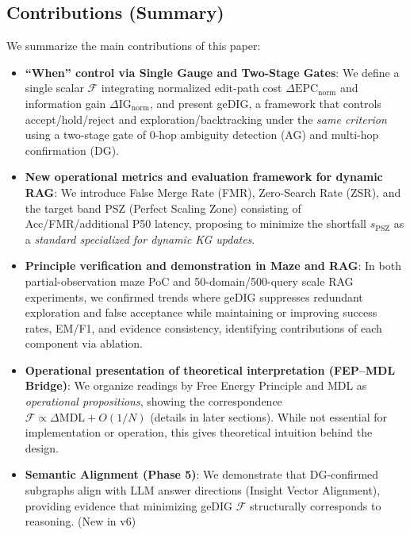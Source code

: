 \documentclass[12pt]{article}
\newcommand{\F}{\mathcal{F}}
\newcommand{\gednorm}{\Delta\mathrm{EPC}_{\mathrm{norm}}}
\newcommand{\ignorm}{\Delta\mathrm{IG}_{\mathrm{norm}}}
\begin{document}
\subsection*{Contributions (Summary)}
We summarize the main contributions of this paper:
\begin{itemize}[leftmargin=1.6em]
  \item \textbf{``When'' control via Single Gauge and Two-Stage Gates}: We define a single scalar $\F$ integrating normalized edit-path cost $\gednorm$ and information gain $\ignorm$, and present geDIG, a framework that controls accept/hold/reject and exploration/backtracking under the \emph{same criterion} using a two-stage gate of 0-hop ambiguity detection (AG) and multi-hop confirmation (DG).
  \item \textbf{New operational metrics and evaluation framework for dynamic RAG}: We introduce False Merge Rate (FMR), Zero-Search Rate (ZSR), and the target band PSZ (Perfect Scaling Zone) consisting of Acc/FMR/additional P50 latency, proposing to minimize the shortfall $s_{\mathrm{PSZ}}$ as a \emph{standard specialized for dynamic KG updates}.
  \item \textbf{Principle verification and demonstration in Maze and RAG}: In both partial-observation maze PoC and 50-domain/500-query scale RAG experiments, we confirmed trends where geDIG suppresses redundant exploration and false acceptance while maintaining or improving success rates, EM/F1, and evidence consistency, identifying contributions of each component via ablation.
  \item \textbf{Operational presentation of theoretical interpretation (FEP--MDL Bridge)}: We organize readings by Free Energy Principle and MDL as \emph{operational propositions}, showing the correspondence $\F\propto\Delta\mathrm{MDL}{+}O(1/N)$ (details in later sections). While not essential for implementation or operation, this gives theoretical intuition behind the design.
  \item \textbf{Semantic Alignment (Phase 5)}: We demonstrate that DG-confirmed subgraphs align with LLM answer directions (Insight Vector Alignment), providing evidence that minimizing geDIG $\F$ structurally corresponds to reasoning. (New in v6)
\end{itemize}
\end{document}
